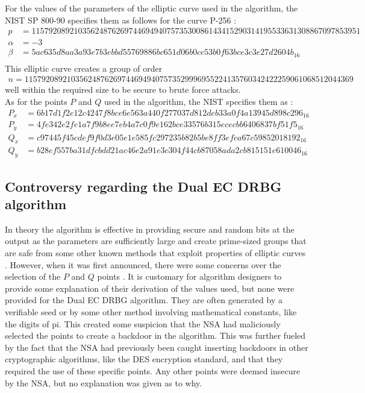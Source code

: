 For the values of the parameters of the elliptic curve used in the algorithm, the NIST SP 800-90 specifies them as follows for the curve P-256 \cite{nist-sp800-90}:
\begin{align*}
    p &= 115792089210356248762697446949407573530086143415290314195533631308867097853951 \\
    \alpha &= -3 \\
    \beta &= 5ac635d8 aa3a93e7 b3ebbd55 769886bc 651d06b0 cc53b0f6 3bce3c3e 27d2604b_{16} \\
\end{align*}
This elliptic curve creates a group of order 
\begin{gather*}
    n = 115792089210356248762697446949407573529996955224135760342422259061068512044369 \label{eq:order}
\end{gather*} 
well within the required size to be secure to brute force attacks.
\\

\noindent
As for the points $P$ and $Q$ used in the algorithm, the NIST specifies them as \cite{nist-sp800-90}:
\begin{align*}
    P_x &= 6b17d1f2 e12c4247 f8bce6e5 63a440f2 77037d81 2deb33a0 f4a13945 d898c296_{16}\\
    P_y &= 4fe342e2 fe1a7f9b 8ee7eb4a 7c0f9e16 2bce3357 6b315ece cbb64068 37bf51f5_{16}\\
    Q_x &= c97445f4 5cdef9f0 d3e05e1e 585fc297 235b82b5 be8ff3ef ca67c598 52018192_{16}\\
    Q_y &= b28ef557 ba31dfcb dd21ac46 e2a91e3c 304f44cb 87058ada 2cb81515 1e610046_{16}
\end{align*}

\subsection{Controversy regarding the Dual EC DRBG algorithm}

In theory the algorithm is effective in providing secure and random bits at the output as the parameters are sufficiently large and create prime-sized groups that are safe from some other known methods that exploit properties of elliptic curves \cite{secure-randomness}. However, when it was first announced, there were some concerns over the selection of the $P$ and $Q$ points \cite{green-2013-dualec-flaws}. It is customary for algorithm designers to provide some explanation of their derivation of the values used, but none were provided for the Dual EC DRBG algorithm. They are often generated by a verifiable seed or by some other method involving mathematical constants, like the digits of pi. This created some suspicion that the NSA had maliciously selected the points to create a backdoor in the algorithm. This was further fueled by the fact that the NSA had previously been caught inserting backdoors in other cryptographic algorithms, like the DES encryption standard, and that they required the use of these specific points. Any other points were deemed insecure by the NSA, but no explanation was given as to why.
\\

